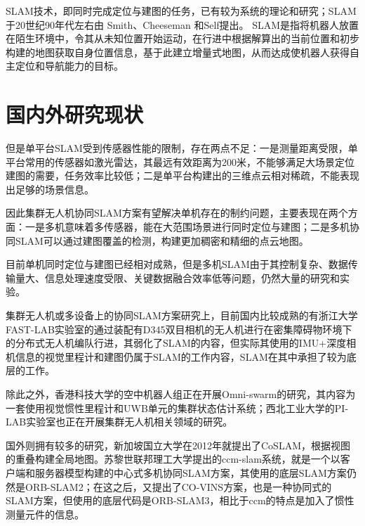 SLAM技术，即同时完成定位与建图的任务，已有较为系统的理论和研究；SLAM于20世纪90年代左右由 Smith、Cheeseman 和Self提出。
SLAM是指将机器人放置在陌生环境中，令其从未知位置开始运动，在行进中根据解算出的当前位置和初步构建的地图获取自身位置信息，基于此建立增量式地图，从而达成使机器人获得自主定位和导航能力的目标\cite{王晨捷2020无人机视觉}。


\section{国内外研究现状}

但是单平台SLAM受到传感器性能的限制，存在两点不足：一是测量距离受限，单平台常用的传感器如激光雷达，其最远有效距离为200米，不能够满足大场景定位建图的需要，任务效率比较低；二是单平台构建出的三维点云相对稀疏，不能表现出足够的场景信息\cite{高家隆2019多无人机协同定位与建图技术研究}。

因此集群无人机协同SLAM方案有望解决单机存在的制约问题，主要表现在两个方面：一是多机意味着多传感器，能在大范围场景进行同时定位与建图；二是多机协同SLAM可以通过建图覆盖的检测，构建更加稠密和精细的点云地图。

目前单机同时定位与建图已经相对成熟，但是多机SLAM由于其控制复杂、数据传输量大、信息处理速度受限、关键数据融合效率低等问题，仍然大量的研究和实验。

集群无人机或多设备上的协同SLAM方案研究上，目前国内比较成熟的有浙江大学FAST-LAB实验室的通过装配有D345双目相机的无人机进行在密集障碍物环境下的分布式无人机编队行进，其弱化了SLAM的内容，但实际其使用的IMU+深度相机信息的视觉里程计和建图仍属于SLAM的工作内容，SLAM在其中承担了较为底层的工作。

除此之外，香港科技大学的空中机器人组正在开展Omni-swarm的研究，其内容为一套使用视觉惯性里程计和UWB单元的集群状态估计系统；西北工业大学的PI-LAB实验室也正在开展集群无人机相关领域的研究。

国外则拥有较多的研究，新加坡国立大学在2012年就提出了CoSLAM，根据视图的重叠构建全局地图\cite{zou2012coslam}。苏黎世联邦理工大学提出的ccm-slam系统，就是一个以客户端和服务器模型构建的中心式多机协同SLAM方案，其使用的底层SLAM方案仍然是ORB-SLAM2\cite{schmuck2019ccm}；在这之后，又提出了CO-VINS方案，也是一种协同式的SLAM方案，但使用的底层代码是ORB-SLAM3\cite{9585827}，相比于ccm的特点是加入了惯性测量元件的信息。

